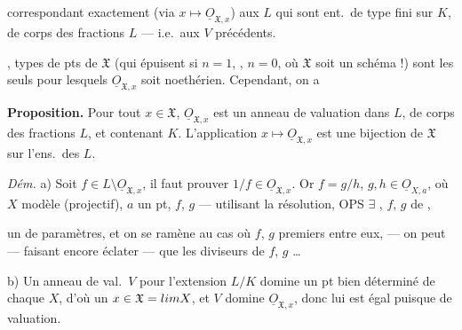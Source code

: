 \documentclass[11pt,a4paper]{article}
\begin{document}

correspondant exactement (via $x \mapsto \underline{O}_{\mathfrak{X},x}$) aux   $L$ qui sont ent.\ de type fini sur $K$, de corps des fractions $L$ — i.e.\ aux $V$ précédents.

,  types de pts de $\mathfrak{X}$ (qui épuisent  si $n = 1$, ,  $n = 0$, où $\mathfrak{X}$ soit un schéma !) sont les seuls pour lesquels $\underline{O}_{\mathfrak{X},x}$ soit noethérien. Cependant, on a


\textbf{Proposition.} Pour tout $x \in \mathfrak{X}$, $\underline{O}_{\mathfrak{X},x}$ est un anneau de valuation dans $L$, de corps des fractions $L$, et contenant $K$. L'application $x \mapsto \underline{O}_{\mathfrak{X},x}$ est une bijection de $\mathfrak{X}$ sur l'ens.\ des  \ill{}   $L$.

\emph{Dém.} a) Soit $f \in L \setminus \underline{O}_{\mathfrak{X},x}$, il faut prouver $1/f \in \underline{O}_{\mathfrak{X},x}$. Or $f = g/h$, $g, h \in \underline{O}_{X,a}$, où $X$ modèle  (projectif), $a$ un pt, $f$, $g$  \ill{} — utilisant la résolution, OPS $\exists$  \struck{\ill{}} \ill{} \struck{\ill{}}, \ill{} $f$, $g$  \ill{} de , \ill{}


un  de paramètres, et on se ramène au cas où $f$, $g$ premiers entre eux, — on peut — faisant encore éclater —  que les diviseurs de $f$, $g$ \struck{\ill{}} …

b) Un anneau de val.\ $V$  pour l'extension $L/K$ domine un pt bien déterminé  de chaque $X$, d'où un $x \in \mathfrak{X} = \varprojlim X$, et $V$ domine $\underline{O}_{\mathfrak{X},x}$, donc lui est égal puisque \ill{}  \ill{}  \ill{} de valuation.
\end{document}
